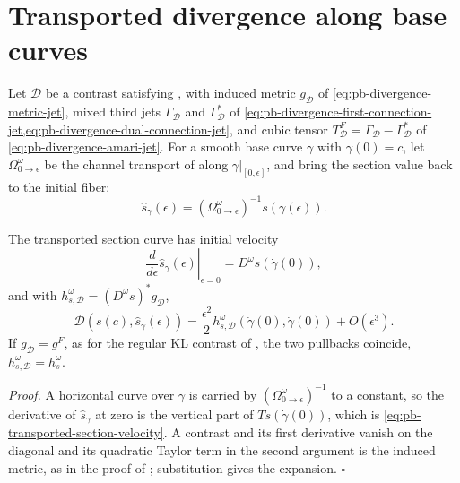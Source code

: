 \section{Transported divergence along base curves}
\label{sec:pb-transported-divergence}

Let \(\mathscr D\) be a contrast satisfying , with induced metric
\(g_{\mathscr D}\) of \eqref{eq:pb-divergence-metric-jet}, mixed third jets \(\Gamma_{\mathscr D}\)
and \(\Gamma^*_{\mathscr D}\) of \cref{eq:pb-divergence-first-connection-jet,eq:pb-divergence-dual-connection-jet},
and cubic tensor \(T^F_{\mathscr D}=\Gamma_{\mathscr D}-\Gamma^*_{\mathscr D}\) of
\eqref{eq:pb-divergence-amari-jet}. For a smooth base curve \(\gamma\) with \(\gamma(0)=c\), let
\(\Omega^\omega_{0\to\epsilon}\) be the channel transport of  along
\(\gamma|_{[0,\epsilon]}\), and bring the section value back to the initial fiber:
\begin{equation}
\widehat s_\gamma(\epsilon)
=(\Omega^\omega_{0\to\epsilon})^{-1}s(\gamma(\epsilon)).
\label{eq:pb-transported-section-curve}
\end{equation}

The transported section curve has initial velocity
\begin{equation}
\left.\frac{d}{d\epsilon}\widehat s_\gamma(\epsilon)\right|_{\epsilon=0}
=D^\omega s(\dot\gamma(0)),
\label{eq:pb-transported-section-velocity}
\end{equation}
and with \(h_{s,\mathscr D}^\omega=(D^\omega s)^*g_{\mathscr D}\),
\begin{equation}
\mathscr D(s(c),\widehat s_\gamma(\epsilon))
=\frac{\epsilon^2}{2}h_{s,\mathscr D}^\omega
(\dot\gamma(0),\dot\gamma(0))
+O(\epsilon^3).
\label{eq:pb-transported-divergence-expansion}
\end{equation}
If \(g_{\mathscr D}=g^F\), as for the regular KL contrast of
, the two pullbacks coincide,
\(h_{s,\mathscr D}^\omega=h_s^\omega\). 

\noindent\emph{Proof.}
A horizontal curve over \(\gamma\) is carried by \((\Omega^\omega_{0\to\epsilon})^{-1}\) to a constant,
so the derivative of \(\widehat s_\gamma\) at zero is the vertical part of \(Ts(\dot\gamma(0))\),
which is \eqref{eq:pb-transported-section-velocity}. A contrast and its first derivative vanish on the
diagonal and its quadratic Taylor term in the second argument is the induced metric, as in the proof
of ; substitution gives the expansion. \hfill$\square$

